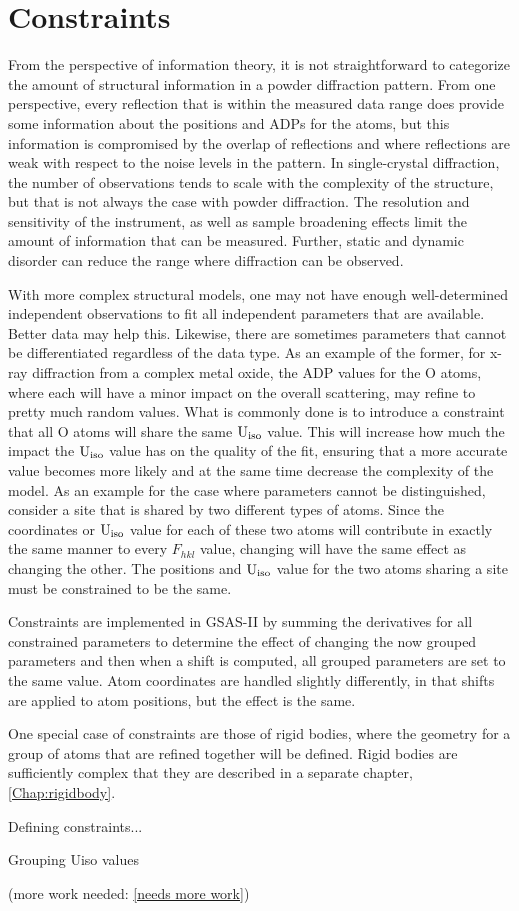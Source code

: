 \chapter{Constraints}\label{Chap:constraints}

From the perspective of information theory, it is not straightforward to categorize the amount of structural information in a powder diffraction pattern. From one perspective, every reflection that is within the measured data range does provide some information about the positions and ADPs for the atoms, but this information is compromised by the overlap of reflections and where reflections are weak with respect to the noise levels in the pattern. In single-crystal diffraction, the number of observations tends to scale with the complexity of the structure, but that is not always the case with powder diffraction. The resolution and sensitivity of the instrument, as well as sample broadening effects limit the amount of information that can be measured. Further, static and dynamic disorder can reduce the range where diffraction can be observed. 

With more complex structural models, one may not have enough well-determined independent observations to fit all independent parameters that are available. Better data may help this. Likewise, there are sometimes parameters that cannot be differentiated regardless of the data type. As an example of the former, for x-ray diffraction from a complex metal oxide, the ADP values for the O atoms, where each will have a minor impact on the overall scattering, may refine to pretty much random values. What is commonly done is to introduce a constraint that all O atoms will share the same $\rm U_{iso}$ value. This will increase how much the impact the $\rm U_{iso}$ value has on the quality of the fit, ensuring that a more accurate value becomes more likely and at the same time decrease the complexity of the model. As an example for the case where parameters cannot be distinguished, consider a site that is shared by two different types of atoms. Since the coordinates or $\rm U_{iso}$ value for each of these two atoms will contribute in exactly the same manner to every $F_{hkl}$ value, changing will have the same effect as changing the other. The positions and $\rm U_{iso}$ value for the two atoms sharing a site must be constrained to be the same. 

Constraints are implemented in GSAS-II by summing the derivatives for all constrained parameters to determine the effect of changing the now grouped parameters and then when a shift is computed, all grouped parameters are set to the same value. Atom coordinates are handled slightly differently, in that shifts are applied to atom positions, but the effect is the same.

One special case of constraints are those of rigid bodies, where the geometry for a group of atoms that are refined together will be defined. Rigid bodies are sufficiently complex that they are described in a separate chapter, \ref{Chap:rigidbody}.


Defining constraints... 

Grouping Uiso values

(more work needed: \ref{needs more work})
